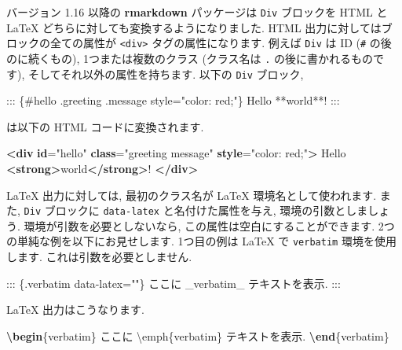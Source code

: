 \documentclass[
  11pt,
  lualatex,ja=standard,jafont=noto]{bxjsreport}
\newenvironment{Shaded}{\begin{snugshade}}{\end{snugshade}}
\newcommand{\ErrorTok}[1]{\textcolor[rgb]{0.64,0.00,0.00}{\textbf{#1}}}
\newcommand{\ExtensionTok}[1]{#1}
\newcommand{\KeywordTok}[1]{\textcolor[rgb]{0.13,0.29,0.53}{\textbf{#1}}}
\newcommand{\NormalTok}[1]{#1}
\newcommand{\OtherTok}[1]{\textcolor[rgb]{0.56,0.35,0.01}{#1}}
\newcommand{\StringTok}[1]{\textcolor[rgb]{0.31,0.60,0.02}{#1}}
\newcommand{\VerbatimStringTok}[1]{\textcolor[rgb]{0.31,0.60,0.02}{#1}}
\begin{document}
バージョン 1.16 以降の \textbf{rmarkdown} パッケージは \texttt{Div} ブロックを HTML と LaTeX どちらに対しても変換するようになりました. HTML 出力に対してはブロックの全ての属性が \texttt{\textless{}div\textgreater{}} タグの属性になります. 例えば \texttt{Div} は ID (\texttt{\#} の後のに続くもの), 1つまたは複数のクラス (クラス名は \texttt{.} の後に書かれるものです), そしてそれ以外の属性を持ちます. 以下の \texttt{Div} ブロック,

\begin{Shaded}
\begin{Highlighting}[]
\NormalTok{::: \{\#hello .greeting .message style="color: red;"\}}
\NormalTok{Hello **world**!}
\NormalTok{:::}
\end{Highlighting}
\end{Shaded}

は以下の HTML コードに変換されます.

\begin{Shaded}
\begin{Highlighting}[]
\KeywordTok{\textless{}div} \ErrorTok{id}\OtherTok{=}\StringTok{"hello"} \ErrorTok{class}\OtherTok{=}\StringTok{"greeting message"} \ErrorTok{style}\OtherTok{=}\StringTok{"color: red;"}\KeywordTok{\textgreater{}}
\NormalTok{  Hello }\KeywordTok{\textless{}strong\textgreater{}}\NormalTok{world}\KeywordTok{\textless{}/strong\textgreater{}}\NormalTok{!}
\KeywordTok{\textless{}/div\textgreater{}}
\end{Highlighting}
\end{Shaded}

LaTeX 出力に対しては, 最初のクラス名が LaTeX 環境名として使われます. また, \texttt{Div} ブロックに \texttt{data-latex} と名付けた属性を与え, 環境の引数としましょう. 環境が引数を必要としないなら, この属性は空白にすることができます. 2つの単純な例を以下にお見せします. 1つ目の例は LaTeX で \texttt{verbatim} 環境を使用します. これは引数を必要としません.

\begin{Shaded}
\begin{Highlighting}[]
\NormalTok{::: \{.verbatim data{-}latex=""\}}
\NormalTok{ここに \_verbatim\_ テキストを表示.}
\NormalTok{:::}
\end{Highlighting}
\end{Shaded}

LaTeX 出力はこうなります.

\begin{Shaded}
\begin{Highlighting}[]
\KeywordTok{\textbackslash{}begin}\NormalTok{\{}\ExtensionTok{verbatim}\NormalTok{\}}
\VerbatimStringTok{ここに \textbackslash{}emph\{verbatim\} テキストを表示.}
\KeywordTok{\textbackslash{}end}\NormalTok{\{}\ExtensionTok{verbatim}\NormalTok{\}}
\end{Highlighting}
\end{Shaded}
\end{document}
